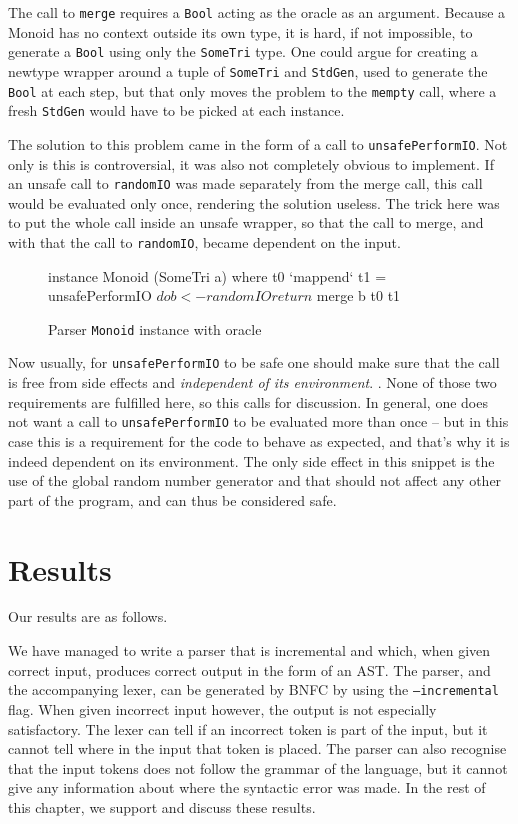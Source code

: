 \documentclass[a4paper,12pt,twosided]{report}
\renewcommand\cite{\citep}
\begin{document}
The call to \texttt{merge} requires a \texttt{Bool} acting as the oracle as an
argument. Because a Monoid has no context outside its own type, it is hard, if not
impossible, to generate a \texttt{Bool} using only the \texttt{SomeTri} type.
One could argue for creating a newtype wrapper around a tuple of
\texttt{SomeTri} and \texttt{StdGen}, used to generate the \texttt{Bool} at each
step, but that only moves the problem to the \texttt{mempty}
call, where a fresh \texttt{StdGen} would have to be picked at each instance.

The solution to this problem came in the form of a call to
\texttt{unsafePerformIO}.  Not only is this is controversial, it was also not
completely obvious to implement. If an unsafe call to \texttt{randomIO} was made
separately from the merge call, this call would be evaluated only once,
rendering the solution useless. The trick here was to put the whole call inside
an unsafe wrapper, so that the call to merge, and with that the call to
\texttt{randomIO}, became dependent on the input.

\begin{figure}[H]
\begin{code}
instance Monoid (SomeTri a) where
    t0 `mappend` t1 = unsafePerformIO $ do
      b <- randomIO
      return $ merge b t0 t1
\end{code}
\caption{Parser \texttt{Monoid} instance with oracle}
\end{figure}

Now usually, for \texttt{unsafePerformIO} to be safe one should make sure that
the call is free from side effects and \textit{independent of its environment}.
\cite{unsafeHackage}. None of those two requirements are fulfilled here, so 
this calls for discussion. In general, one does not want a call to
\texttt{unsafePerformIO} to be evaluated more than once -- but in this case this
is a requirement for the code to behave as expected, and that's why it is indeed
dependent on its environment. The only side effect in this snippet is the use of
the global random number generator and that should not affect any other part of
the program, and can thus be considered safe.

%
%

\chapter{Results}
Our results are as follows.

We have managed to write a parser that is incremental and which, when given
correct input, produces correct output in the form of an AST. The parser, and
the accompanying lexer, can be generated by BNFC by using the
\texttt{---incremental} flag. When given incorrect input however, the output is
not especially satisfactory. The lexer can tell if an incorrect token is part of
the input, but it cannot tell where in the input that token is placed. The
parser can also recognise that the input tokens does not follow the grammar of
the language, but it cannot give any information about where the syntactic error
was made. In the rest of this chapter, we support and discuss these results. 
\end{document}
